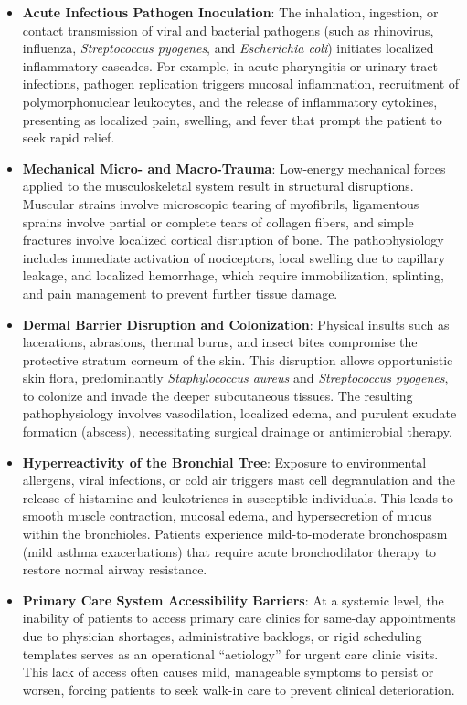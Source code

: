 \begin{itemize}
  \item \textbf{Acute Infectious Pathogen Inoculation}: The inhalation, ingestion, or contact transmission of viral and bacterial pathogens (such as rhinovirus, influenza, \textit{Streptococcus pyogenes}, and \textit{Escherichia coli}) initiates localized inflammatory cascades. For example, in acute pharyngitis or urinary tract infections, pathogen replication triggers mucosal inflammation, recruitment of polymorphonuclear leukocytes, and the release of inflammatory cytokines, presenting as localized pain, swelling, and fever that prompt the patient to seek rapid relief.
  \item \textbf{Mechanical Micro- and Macro-Trauma}: Low-energy mechanical forces applied to the musculoskeletal system result in structural disruptions. Muscular strains involve microscopic tearing of myofibrils, ligamentous sprains involve partial or complete tears of collagen fibers, and simple fractures involve localized cortical disruption of bone. The pathophysiology includes immediate activation of nociceptors, local swelling due to capillary leakage, and localized hemorrhage, which require immobilization, splinting, and pain management to prevent further tissue damage.
  \item \textbf{Dermal Barrier Disruption and Colonization}: Physical insults such as lacerations, abrasions, thermal burns, and insect bites compromise the protective stratum corneum of the skin. This disruption allows opportunistic skin flora, predominantly \textit{Staphylococcus aureus} and \textit{Streptococcus pyogenes}, to colonize and invade the deeper subcutaneous tissues. The resulting pathophysiology involves vasodilation, localized edema, and purulent exudate formation (abscess), necessitating surgical drainage or antimicrobial therapy.
  \item \textbf{Hyperreactivity of the Bronchial Tree}: Exposure to environmental allergens, viral infections, or cold air triggers mast cell degranulation and the release of histamine and leukotrienes in susceptible individuals. This leads to smooth muscle contraction, mucosal edema, and hypersecretion of mucus within the bronchioles. Patients experience mild-to-moderate bronchospasm (mild asthma exacerbations) that require acute bronchodilator therapy to restore normal airway resistance.
  \item \textbf{Primary Care System Accessibility Barriers}: At a systemic level, the inability of patients to access primary care clinics for same-day appointments due to physician shortages, administrative backlogs, or rigid scheduling templates serves as an operational ``aetiology'' for urgent care clinic visits. This lack of access often causes mild, manageable symptoms to persist or worsen, forcing patients to seek walk-in care to prevent clinical deterioration.
\end{itemize}

